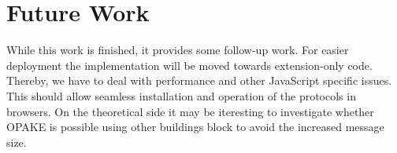 \section{Future Work}
While this work is finished, it provides some follow-up work.
For easier deployment the implementation will be moved towards extension-only code.
Thereby, we have to deal with performance and other JavaScript specific issues.
This should allow seamless installation and operation of the protocols in browsers.
On the theoretical side it may be iteresting to investigate whether \ac{OPAKE} is possible using other buildings block to avoid the increased message size.

